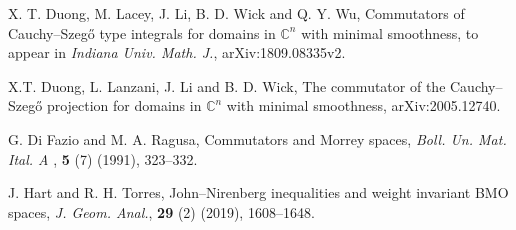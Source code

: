 \documentclass[11pt,a4paper]{amsart}
\numberwithin{equation}{section}
\def\C{\mathbb C}
\begin{document}
{\begin{thebibliography}{10}
%
%
%
%
%
%
%
%
%
%



  {X. T. Duong, M. Lacey, J. Li, B. D. Wick and Q. Y. Wu, Commutators of Cauchy--Szeg\H{o} type integrals for domains  in $\C^n$ with minimal smoothness}, to appear in {\it Indiana Univ. Math. J.}, arXiv:1809.08335v2.


 X.T. Duong, L. Lanzani, J. Li and B. D. Wick, The commutator of the Cauchy--Szeg\H{o} projection for domains in $\mathbb C^n$ with minimal smoothness, arXiv:2005.12740.



G. Di Fazio and M. A. Ragusa, Commutators and Morrey spaces, {\it Boll. Un. Mat. Ital. A }, {\bf 5} (7) (1991), 323--332.


%
%

  {\sc J. Hart and R. H. Torres}, John--Nirenberg inequalities and weight invariant BMO spaces, {\it J. Geom. Anal.}, {\bf 29} (2) (2019), 1608--1648.


\end{thebibliography}}
\end{document}
